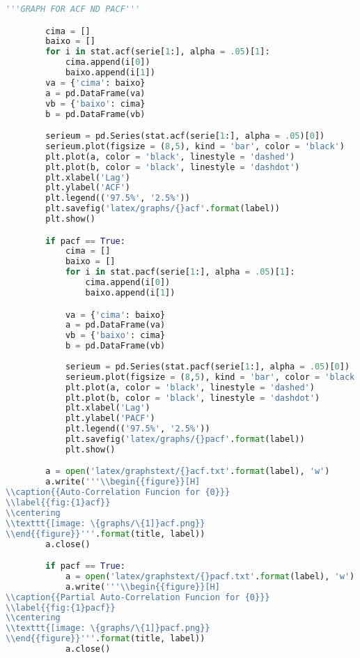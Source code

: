 \begin{lstlisting}[language=Python]
        '''GRAPH FOR ACF ND PACF'''

        cima = []
        baixo = []
        for i in stat.acf(serie[1:], alpha = .05)[1]:
            cima.append(i[0])
            baixo.append(i[1])
        va = {'cima': baixo}
        a = pd.DataFrame(va)
        vb = {'baixo': cima}
        b = pd.DataFrame(vb)

        serieum = pd.Series(stat.acf(serie[1:], alpha = .05)[0])
        serieum.plot(figsize = (8,5), kind = 'bar', color = 'black')
        plt.plot(a, color = 'black', linestyle = 'dashed')
        plt.plot(b, color = 'black', linestyle = 'dashdot')
        plt.xlabel('Lag')
        plt.ylabel('ACF')
        plt.legend(('97.5%', '2.5%'))
        plt.savefig('latex/graphs/{}acf'.format(label))
        plt.show()

        if pacf == True:
            cima = []
            baixo = []
            for i in stat.pacf(serie[1:], alpha = .05)[1]:
                cima.append(i[0])
                baixo.append(i[1])

            va = {'cima': baixo}
            a = pd.DataFrame(va)
            vb = {'baixo': cima}
            b = pd.DataFrame(vb)
            
            serieum = pd.Series(stat.pacf(serie[1:], alpha = .05)[0])
            serieum.plot(figsize = (8,5), kind = 'bar', color = 'black')
            plt.plot(a, color = 'black', linestyle = 'dashed')
            plt.plot(b, color = 'black', linestyle = 'dashdot')
            plt.xlabel('Lag')
            plt.ylabel('PACF')
            plt.legend(('97.5%', '2.5%'))
            plt.savefig('latex/graphs/{}pacf'.format(label))
            plt.show()

        a = open('latex/graphstext/{}acf.txt'.format(label), 'w')
        a.write('''\\begin{{figure}}[H]
\\caption{{Auto-Correlation Funcion for {0}}}
\\label{{fig:{1}acf}}
\\centering
\\texttt{[image: \{graphs/\{1]}acf.png}}
\\end{{figure}}'''.format(title, label))
        a.close() 

        if pacf == True:
            a = open('latex/graphstext/{}pacf.txt'.format(label), 'w')
            a.write('''\\begin{{figure}}[H]
\\caption{{Partial Auto-Correlation Funcion for {0}}}
\\label{{fig:{1}pacf}}
\\centering
\\texttt{[image: \{graphs/\{1]}pacf.png}}
\\end{{figure}}'''.format(title, label))
            a.close() 
        
\end{lstlisting}